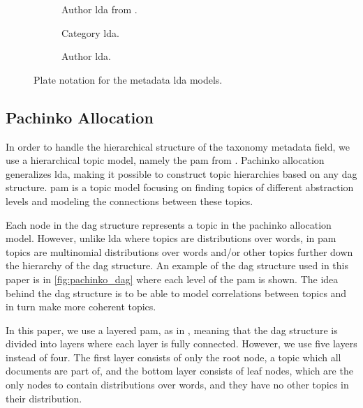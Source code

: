 \begin{figure*}[ht]
	\centering
	\begin{subfigure}{0.275\textwidth}
		\centering
		\resizebox{\textwidth}{!}{%
			
		}
		\caption{Author \gls{lda} from \cite{author_topic_2012}.}
		\label{fig:original_author_lda}
	\end{subfigure}
	\hspace{2em}
	\begin{subfigure}{0.275\textwidth}
		\centering
		\resizebox{\textwidth}{!}{%
		
		}
		\caption{Category \gls{lda}.}
		\label{fig:category_lda}
	\end{subfigure}
	\hspace{2em}
	\begin{subfigure}{0.275\textwidth}
		\centering
		\resizebox{\textwidth}{!}{%
			
		}
		\caption{Author \gls{lda}.}
		\label{fig:author_lda}
	\end{subfigure}	
	\caption{Plate notation for the metadata \gls{lda} models.}
	\label{fig:metadata_lda}
\end{figure*}

\subsection{Pachinko Allocation}
In order to handle the hierarchical structure of the taxonomy metadata field, we use a hierarchical topic model, namely the \acrfull{pam} from \citet{li2006pachinko}.
Pachinko allocation generalizes \gls{lda}, making it possible to construct topic hierarchies based on any \gls{dag} structure.
\gls{pam} is a topic model focusing on finding topics of different abstraction levels and modeling the connections between these topics.

Each node in the \gls{dag} structure represents a topic in the pachinko allocation model. 
However, unlike \gls{lda} where topics are distributions over words, in \gls{pam} topics are multinomial distributions over words and/or other topics further down the hierarchy of the \gls{dag} structure.
An example of the \gls{dag} structure used in this paper is in \autoref{fig:pachinko_dag} where each level of the \gls{pam} is shown.
The idea behind the \gls{dag} structure is to be able to model correlations between topics and in turn make more coherent topics.
  
In this paper, we use a layered \gls{pam}, as in \cite{author_topic_2012}, meaning that the \gls{dag} structure is divided into layers where each layer is fully connected.
However, we use five layers instead of four.
The first layer consists of only the root node, a topic which all documents are part of, and the bottom layer consists of leaf nodes, which are the only nodes to contain distributions over words, and they have no other topics in their distribution.

